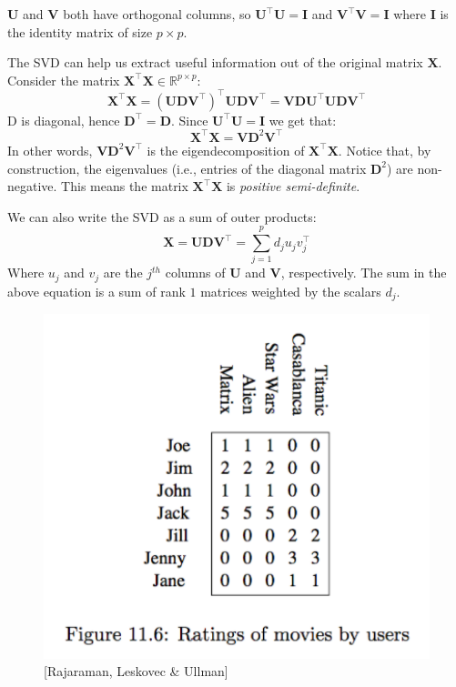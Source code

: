 \documentclass[a4paper]{article}
\begin{document}
$\mathbf{U}$ and $\mathbf{V}$ both have orthogonal columns, so $\mathbf{U}^\top\mathbf{U}=\mathbf{I}$ and $\mathbf{V}^\top\mathbf{V}=\mathbf{I}$ where $\mathbf{I}$ is the identity matrix of size $p\times p$.

The SVD can help us extract useful information out of the original matrix $\mathbf{X}$.
Consider the matrix $\mathbf{X}^\top\mathbf{X}\in \mathbb{R}^{p \times p}$:
$$\mathbf{X}^\top\mathbf{X}=(\mathbf{UDV}^\top)^\top\mathbf{UDV}^\top=\mathbf{V} \mathbf{D}\mathbf{U}^\top\mathbf{UDV}^\top$$
D is diagonal, hence $\mathbf{D}^\top=\mathbf{D}$. Since $\mathbf{U}^\top\mathbf{U}=\mathbf{I}$ we get that:
$$\mathbf{X}^\top\mathbf{X}=\mathbf{VD}^2\mathbf{V}^\top$$
In other words, $\mathbf{VD}^2\mathbf{V}^\top$ is the eigendecomposition of $\mathbf{X}^\top\mathbf{X}$.  Notice that, by construction, the eigenvalues (i.e., entries of the diagonal matrix $\mathbf{D}^2$) are non-negative.  This means the matrix $\mathbf{X}^\top\mathbf{X}$ is \textit{positive semi-definite}.

We can also write the SVD as a sum of outer products: $$\mathbf{X}=\mathbf{UD}\mathbf{V}^\top=\sum_{j=1}^pd_ju_jv_j^\top$$
Where $u_j$ and $v_j$ are the  $j^{th}$ columns of $\mathbf{U}$ and $\mathbf{V}$, respectively. The sum in the above equation is a sum of rank $1$ matrices weighted by the scalars $d_j$.


\begin{figure}
\centering
\includegraphics[width=1.0\textwidth]{people_by_movie_matrix.png}
\caption{\label{fig:PeopleByMovies}[Rajaraman, Leskovec \& Ullman]}
\end{figure}
\end{document}
